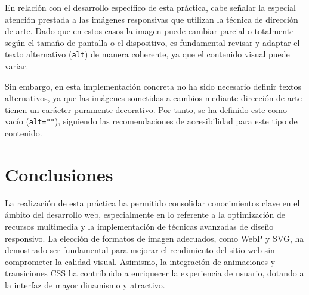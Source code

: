 \documentclass{article}
\begin{document}
En relación con el desarrollo específico de esta práctica, cabe señalar la especial atención prestada a las imágenes responsivas que utilizan la técnica de dirección de arte. Dado que en estos casos la imagen puede cambiar parcial o totalmente según el tamaño de pantalla o el dispositivo, es fundamental revisar y adaptar el texto alternativo (\texttt{alt}) de manera coherente, ya que el contenido visual puede variar.

Sin embargo, en esta implementación concreta no ha sido necesario definir textos alternativos, ya que las imágenes sometidas a cambios mediante dirección de arte tienen un carácter puramente decorativo. Por tanto, se ha definido este como vacío (\texttt{alt=""}), siguiendo las recomendaciones de accesibilidad para este tipo de contenido.

\section{Conclusiones}\label{sec:conclusiones}

La realización de esta práctica ha permitido consolidar conocimientos clave en el ámbito del desarrollo web, especialmente en lo referente a la optimización de recursos multimedia y la implementación de técnicas avanzadas de diseño responsivo. La elección de formatos de imagen adecuados, como WebP y SVG, ha demostrado ser fundamental para mejorar el rendimiento del sitio web sin comprometer la calidad visual. Asimismo, la integración de animaciones y transiciones CSS ha contribuido a enriquecer la experiencia de usuario, dotando a la interfaz de mayor dinamismo y atractivo.
\end{document}
